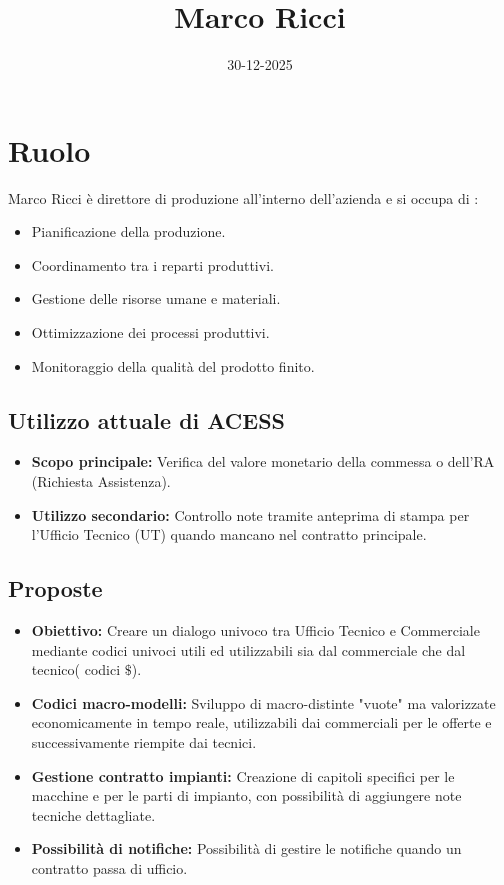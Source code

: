\documentclass[12pt, a4paper]{article} %
\title{Marco Ricci}
\date{30-12-2025}
\begin{document}
\maketitle

\section{Ruolo} 
Marco Ricci è direttore di produzione all'interno dell'azienda e si occupa di :
\begin{itemize}
    \item Pianificazione della produzione.
    \item Coordinamento tra i reparti produttivi.
    \item Gestione delle risorse umane e materiali.
    \item Ottimizzazione dei processi produttivi.
    \item Monitoraggio della qualità del prodotto finito.
\end{itemize}

\subsection{Utilizzo attuale di ACESS}
\begin{itemize}
    \item \textbf{Scopo principale:} Verifica del valore monetario della commessa o dell'RA (Richiesta Assistenza).
    \item \textbf{Utilizzo secondario:} Controllo note tramite anteprima di stampa per l'Ufficio Tecnico (UT) quando mancano nel contratto principale.
\end{itemize}

\subsection{Proposte}
\begin{itemize}
    \item \textbf{Obiettivo:} Creare un dialogo univoco tra Ufficio Tecnico e Commerciale mediante codici univoci utili ed utilizzabili sia dal commerciale che dal tecnico( codici $\mathdollar$).
    \item \textbf{Codici macro-modelli:} Sviluppo di macro-distinte "vuote" ma valorizzate economicamente in tempo reale, utilizzabili dai commerciali per le offerte e successivamente riempite dai tecnici.
    \item \textbf{Gestione contratto impianti:} Creazione di capitoli specifici per le macchine e per le parti di impianto, con possibilità di aggiungere note tecniche dettagliate.
    \item \textbf{Possibilità di notifiche:} Possibilità di gestire le notifiche quando un contratto passa di ufficio.
\end{itemize}
\end{document}
